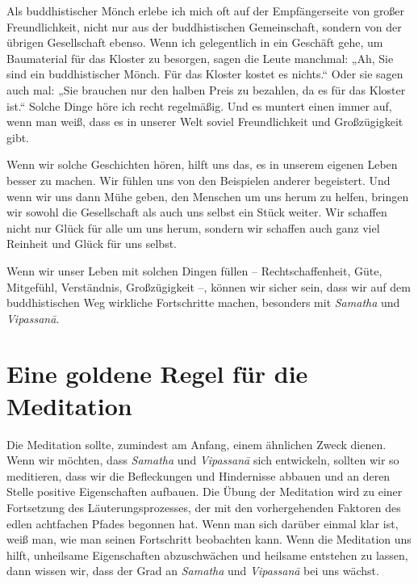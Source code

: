 \documentclass[12pt,openany]{book}
\begin{document}
Als buddhistischer Mönch erlebe ich mich oft auf der Empfängerseite von großer Freundlichkeit, nicht nur aus der buddhistischen Gemeinschaft, sondern von der übrigen Gesellschaft ebenso. Wenn ich gelegentlich in ein Geschäft gehe, um Baumaterial für das Kloster zu besorgen, sagen die Leute manchmal: „Ah, Sie sind ein buddhistischer Mönch. Für das Kloster kostet es nichts.“ Oder sie sagen auch mal: „Sie brauchen nur den halben Preis zu bezahlen, da es für das Kloster ist.“ Solche Dinge höre ich recht regelmäßig. Und es muntert einen immer auf, wenn man weiß, dass es in unserer Welt soviel Freundlichkeit und Großzügigkeit gibt.

Wenn wir solche Geschichten hören, hilft uns das, es in unserem eigenen Leben besser zu machen. Wir fühlen uns von den Beispielen anderer begeistert. Und wenn wir uns dann Mühe geben, den Menschen um uns herum zu helfen, bringen wir sowohl die Gesellschaft als auch uns selbst ein Stück weiter. Wir schaffen nicht nur Glück für alle um uns herum, sondern wir schaffen auch ganz viel Reinheit und Glück für uns selbst.

Wenn wir unser Leben mit solchen Dingen füllen – Rechtschaffenheit, Güte, Mitgefühl, Verständnis, Großzügigkeit –, können wir sicher sein, dass wir auf dem buddhistischen Weg wirkliche Fortschritte machen, besonders mit \textit{Samatha} und \textit{Vipas\-sanā}.

\section*{Eine goldene Regel für die Meditation}

Die Meditation sollte, zumindest am Anfang, einem ähnlichen Zweck dienen. Wenn wir möchten, dass \textit{Samatha} und \textit{Vipas\-sanā} sich entwickeln, sollten wir so meditieren, dass wir die Befleckungen und Hindernisse abbauen und an deren Stelle positive Eigenschaften aufbauen. Die Übung der Meditation wird zu einer Fortsetzung des Läuterungsprozesses, der mit den vorhergehenden Faktoren des edlen achtfachen Pfades begonnen hat. Wenn man sich da\-rüber einmal klar ist, weiß man, wie man seinen Fortschritt beobachten kann. Wenn die Meditation uns hilft, unheilsame Eigenschaften abzuschwächen und heilsame entstehen zu lassen, dann wissen wir, dass der Grad an \textit{Samatha} und \textit{Vipas\-sanā} bei uns wächst.
\end{document}
